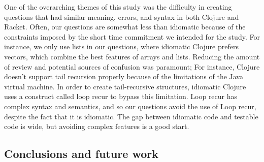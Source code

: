 \documentclass[submission,copyright,creativecommons]{eptcs}
\begin{document}
	One of the overarching themes of this study was the difficulty in creating questions that had similar meaning, errors, and syntax in both Clojure and Racket. 
	Often, our questions are somewhat less than idiomatic because of the constraints imposed by the short time commitment we intended for the study.
	For instance, we only use lists in our questions, where idiomatic Clojure prefers vectors, which combine the best features of arrays and lists.
	 Reducing the amount of review and potential sources of confusion was paramount; For instance, Clojure doesn't support tail recursion properly because of the limitations of the Java virtual machine.
	 In order to create tail-recursive structures, idiomatic Clojure uses a construct called loop recur to bypass this limitation.
	 Loop recur has complex syntax and semantics, and so our questions avoid the use of Loop recur, despite the fact that it is idiomatic. 
	 The gap between idiomatic code and testable code is wide, but avoiding complex features is a good start. %

\subsection{Conclusions and future work}\label{sec:future}



\end{document}
